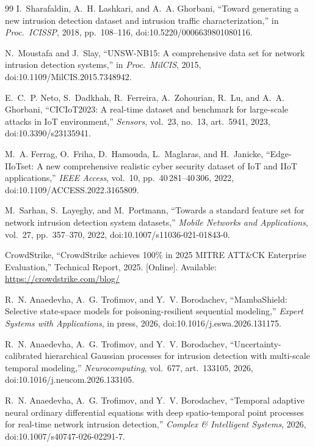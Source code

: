 \documentclass[journal,twoside]{IEEEtran}
\begin{document}
\begin{thebibliography}{99}
I.~Sharafaldin, A.~H. Lashkari, and A.~A. Ghorbani,
``Toward generating a new intrusion detection dataset and intrusion traffic
characterization,''
in \emph{Proc.\ ICISSP}, 2018, pp.~108--116,
doi:10.5220/0006639801080116.

N.~Moustafa and J.~Slay,
``UNSW-NB15: A comprehensive data set for network intrusion detection
systems,''
in \emph{Proc.\ MilCIS}, 2015, doi:10.1109/MilCIS.2015.7348942.

E.~C.~P. Neto, S.~Dadkhah, R.~Ferreira, A.~Zohourian, R.~Lu, and
A.~A. Ghorbani,
``CICIoT2023: A real-time dataset and benchmark for large-scale attacks in
IoT environment,''
\emph{Sensors}, vol.~23, no.~13, art.~5941, 2023, doi:10.3390/s23135941.

M.~A. Ferrag, O.~Friha, D.~Hamouda, L.~Maglaras, and H.~Janicke,
``Edge-IIoTset: A new comprehensive realistic cyber security dataset of IoT
and IIoT applications,''
\emph{IEEE Access}, vol.~10, pp.~40\,281--40\,306, 2022,
doi:10.1109/ACCESS.2022.3165809.

M.~Sarhan, S.~Layeghy, and M.~Portmann,
``Towards a standard feature set for network intrusion detection system
datasets,''
\emph{Mobile Networks and Applications}, vol.~27, pp.~357--370, 2022,
doi:10.1007/s11036-021-01843-0.

CrowdStrike,
``CrowdStrike achieves 100\% in 2025 MITRE ATT\&CK Enterprise Evaluation,''
Technical Report, 2025. [Online]. Available:
\url{https://crowdstrike.com/blog/}


R.~N. Anaedevha, A.~G. Trofimov, and Y.~V. Borodachev,
``MambaShield: Selective state-space models for poisoning-resilient
sequential modeling,''
\emph{Expert Systems with Applications}, in press, 2026,
doi:10.1016/j.eswa.2026.131175.

R.~N. Anaedevha, A.~G. Trofimov, and Y.~V. Borodachev,
``Uncertainty-calibrated hierarchical Gaussian processes for intrusion
detection with multi-scale temporal modeling,''
\emph{Neurocomputing}, vol.~677, art.~133105, 2026,
doi:10.1016/j.neucom.2026.133105.

R.~N. Anaedevha, A.~G. Trofimov, and Y.~V. Borodachev,
``Temporal adaptive neural ordinary differential equations with deep
spatio-temporal point processes for real-time network intrusion detection,''
\emph{Complex \& Intelligent Systems}, 2026,
doi:10.1007/s40747-026-02291-7.


\end{thebibliography}
\end{document}
